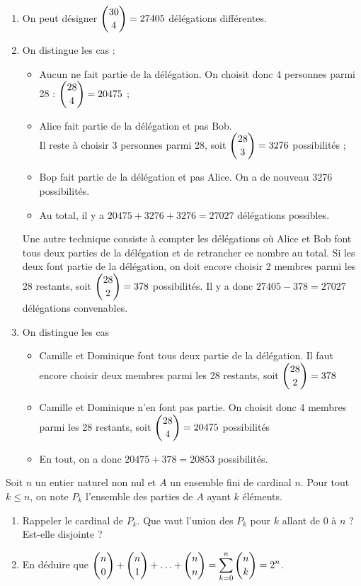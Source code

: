 \documentclass[11pt,fleqn, openany]{book} %
\begin{document}
\begin{solution}\hspace{0pt}
\vspace{-0.5cm}
\begin{enumerate}
\item On peut désigner $\dbinom{30}{4}=27405$ délégations différentes.

\item On distingue les cas :
\begin{itemize}
\item Aucun ne fait partie de la délégation. On choisit donc 4 personnes parmi 28 : $\dbinom{28}{4}=20475$ ;
\item Alice fait partie de la délégation et pas Bob. \\ Il reste à choisir 3 personnes parmi 28, soit $\dbinom{28}{3}=3276$ possibilités ;
\item Bop fait partie de la délégation et pas Alice. On a de nouveau 3276 possibilités.
\item Au total, il y a $20475+3276+3276=27027$ délégations possibles.
\end{itemize}
Une autre technique consiste à compter les délégations où Alice et Bob font tous deux parties de la délégation et de retrancher ce nombre au total. Si les deux font partie de la délégation, on doit encore choisir 2 membres parmi les 28 restants, soit $\dbinom{28}{2}=378$ possibilités. Il y a donc $27405-378=27027$ délégations convenables.

\item On distingue les cas
\begin{itemize}
\item Camille et Dominique font tous deux partie de la délégation. Il faut encore choisir deux membres parmi les 28 restants, soit $\dbinom{28}{2}=378$
\item Camille et Dominique n'en font pas partie. On choisit donc 4 membres parmi les 28 restants, soit $\dbinom{28}{4}=20475$ possibilités
\item En tout, on a donc $20475+378=20853$ possibilités.
\end{itemize}

\end{enumerate}
\newpage
\end{solution}




\begin{exercise}
Soit $n$ un entier naturel non nul et $A$ un ensemble fini de cardinal $n$. Pour tout $k\leqslant n$, on note $P_k$ l'ensemble des parties de $A$ ayant $k$ éléments.
\begin{enumerate}
\item Rappeler le cardinal de $P_k$. Que vaut l'union des $P_k$ pour $k$ allant de 0 à $n$ ? Est-elle disjointe ?
\item En déduire que $\dbinom{n}{0} + \dbinom{n}{1} + \ldots + \dbinom{n}{n} =\displaystyle\sum_{k=0}^{n} \dbinom{n}{k} = 2^n$.
\end{enumerate}\end{exercise}
\end{document}
